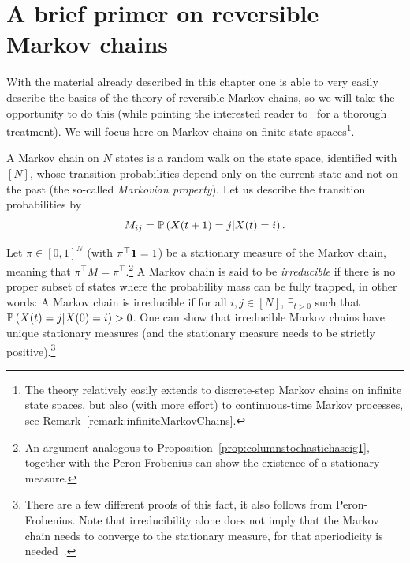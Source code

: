 \section{A brief primer on reversible Markov chains}\label{sec:MarkovChains}

With the material already described in this chapter one is able to very easily describe the basics of the theory of reversible Markov chains, so we will take the opportunity to do this (while pointing the interested reader to~\cite{levinperesmarkovchains2017} for a thorough treatment). We will focus here on Markov chains on finite state spaces\footnote{The theory relatively easily extends to discrete-step Markov chains on infinite state spaces, but also (with more effort) to continuous-time Markov processes, see Remark~\ref{remark:infiniteMarkovChains}.}. 

A Markov chain on $N$ states is a random walk on the state space, identified with $[N]$, whose transition probabilities depend only on the current state and not on the past (the so-called \emph{Markovian property}). Let us describe the transition probabilities by
\begin{equation}\label{eq:MarkovChainTransitionMatrix}
    M_{ij} = \mathbb{P}\left( X(t+1)=j | X(t) = i\right).
\end{equation}

Let $\pi\in[0,1]^{N}$ (with $\pi^\top\mathbf{1}=1$) be a stationary measure of the Markov chain, meaning that $\pi^\top M = \pi^\top$.\footnote{An argument analogous to Proposition~\ref{prop:columnstochastichaseig1}, together with the Peron-Frobenius can show the existence of a stationary measure.} A Markov chain is said to be \emph{irreducible} if there is no proper subset of states where the probability mass can be fully trapped, in other words: A Markov chain is irreducible if for all $i,j\in[N]$, $\exists_{t>0}$ such that $\mathbb{P}\left( X(t)=j | X(0) = i\right)>0$. One can show that irreducible Markov chains have unique stationary measures (and the stationary measure needs to be strictly positive).\footnote{There are a few different proofs of this fact, it also follows from Peron-Frobenius. Note that irreducibility alone does not imply that the Markov chain needs to converge to the stationary measure, for that aperiodicity is needed~\cite{levinperesmarkovchains2017}.}

